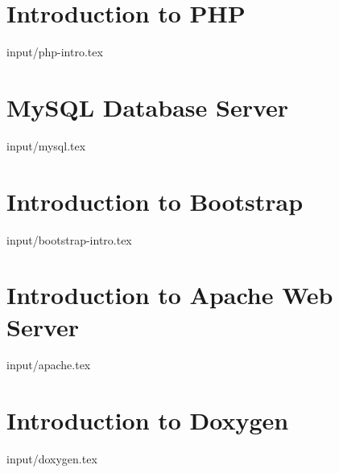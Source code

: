 
\section{Introduction to PHP}
 {input/php-intro.tex}
\section{MySQL Database Server}
 {input/mysql.tex}
\section{Introduction to Bootstrap} 

 {input/bootstrap-intro.tex}
\section{Introduction to Apache Web Server}

 {input/apache.tex}




\section{Introduction to Doxygen}
 {input/doxygen.tex}
